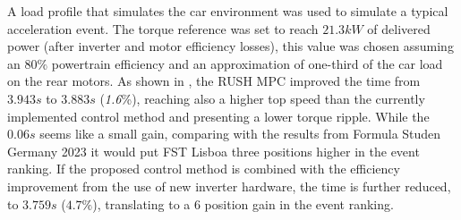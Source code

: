 \documentclass[9pt,conference]{IEEEtran}
\begin{document}
A load profile that simulates the car environment was used to simulate a typical acceleration event. The torque reference was set to reach $21.3kW$ of delivered power (after inverter and motor efficiency losses), this value was chosen assuming an $80\%$ powertrain efficiency and an approximation of one-third of the car load on the rear motors. As shown in , the RUSH MPC improved the time from $3.943s$ to $3.883s$ (\textit{1.6}\%), reaching also a higher top speed than the currently implemented control method and presenting a lower torque ripple. While the $0.06s$ seems like a small gain, comparing with the results from Formula Studen Germany 2023 it would put FST Lisboa three positions higher in the event ranking. If the proposed control method is combined with the efficiency improvement from the use of new inverter hardware, the time is further reduced, to $3.759s$ ($4.7\%$), translating to a 6 position gain in the event ranking.
\patchcmd{\subfigmatrix}{\hfill}{\hspace{0.2cm}}{}{}
\end{document}
